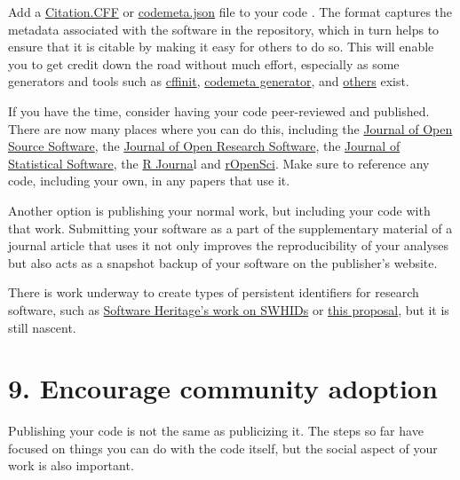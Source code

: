 \documentclass[10pt,letterpaper]{article}
\begin{document}
Add a \href{https://citation-file-format.github.io/}{Citation.CFF}
or \href{https://codemeta.github.io}{codemeta.json} file to your code \cite{Druskat2021}.
The format captures the metadata associated with the software in the repository,
which in turn helps to ensure that it is citable by making it easy for others to do so.
This will enable you to get credit down the road without much effort,
especially as some generators and tools
such as \href{https://citation-file-format.github.io/cff-initializer-javascript/}{cffinit},
\href{https://codemeta.github.io/codemeta-generator/}{codemeta generator},
and \href{https://github.com/citation-file-format/citation-file-format/blob/main/README.md\#tools-to-work-with-citationcff-files-wrench}{others} exist.

If you have the time,
consider having your code peer-reviewed and published.
There are now many places where you can do this,
including the \href{https://joss.theoj.org/}{Journal of Open Source Software},
the \href{https://openresearchsoftware.metajnl.com/}{Journal of Open Research Software},
the \href{http://www.jstatsoft.org}{Journal of Statistical Software},
the \href{https://journal.r-project.org/}{R Journa}l
and \href{https://ropensci.org/}{rOpenSci}.
Make sure to reference any code,
including your own,
in any papers that use it.

Another option is publishing your normal work,
but including your code with that work.
Submitting your software as a part of the supplementary material of a journal article that uses it
not only improves the reproducibility of your analyses
but also acts as a snapshot backup of your software on the publisher's website.

There is work underway to create types of persistent identifiers for research software,
such as \href{https://interoperable-europe.ec.europa.eu/collection/open-source-observatory-osor/news/swhid-intrinsic-identifier-software-artefacts}{Software Heritage's work on SWHIDs}
or \href{https://arxiv.org/abs/2501.10415}{this proposal},
but it is still nascent.

\section*{9. Encourage community adoption}

Publishing your code is not the same as publicizing it.
The steps so far have focused on things you can do with the code itself,
but the social aspect of your work is also important.
\end{document}
